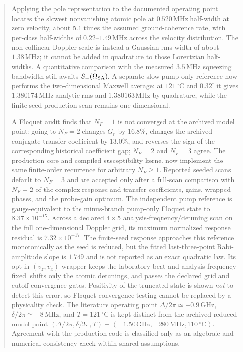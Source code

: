 \documentclass[11pt,a4paper]{article}
\newcommand{\GHz}{\,\mathrm{GHz}}
\newcommand{\MHz}{\,\mathrm{MHz}}
\newcommand{\degC}{\,^{\circ}\mathrm C}
\begin{document}
\begin{abstract}
Applying the pole representation to the documented operating point locates the
slowest nonvanishing atomic pole at $0.520\MHz$ half-width at zero velocity,
about $5.1$ times the assumed ground-coherence rate, with per-class half-widths
of $0.22$--$1.49\MHz$ across the velocity distribution. The non-collinear
Doppler scale is instead a Gaussian rms width of about $1.38\MHz$; it cannot be
added in quadrature to those Lorentzian half-widths. A quantitative comparison
with the measured $3.5\MHz$ squeezing bandwidth still awaits
$S_-(\Omega_{\rm SA})$. A separate slow pump-only reference now performs the
two-dimensional Maxwell average: at $121\degC$ and $0.32^\circ$ it gives
$1.380174\MHz$ analytic rms and $1.380163\MHz$ by quadrature, while the
finite-seed production scan remains one-dimensional.

A Floquet audit finds that $N_F=1$ is not converged at the archived model
point: going to $N_F=2$ changes $G_p$ by $16.8\%$, changes the archived
conjugate transfer coefficient by $13.0\%$, and reverses the sign of the
corresponding historical coefficient gap; $N_F=2$ and $N_F=3$ agree.
The production core and compiled susceptibility kernel now implement the same
finite-order recurrence for arbitrary $N_F\geq1$. Reported seeded scans default
to $N_F=3$ and are accepted only after a full-scan comparison with $N_F=2$ of
the complex response and transfer coefficients, gains, wrapped phases, and the
probe-gain optimum.
The independent pump reference is gauge-equivalent to the minus-branch
pump-only Floquet state to $8.37\times10^{-15}$. Across a declared
$4\times5$ analysis-frequency/detuning scan on the full one-dimensional
Doppler grid, its maximum normalized response residual is
$7.32\times10^{-17}$. The finite-seed response approaches this reference
monotonically as the seed is reduced, but the fitted last-three-point
Rabi-amplitude slope is $1.749$ and is not reported as an exact quadratic law.
Its opt-in $(v_z,v_x)$ wrapper keeps the laboratory beat and analysis
frequency fixed, shifts only the atomic detunings, and passes the declared
grid and cutoff convergence gates.
Positivity of
the truncated state is shown \emph{not} to detect this error, so Floquet
convergence testing cannot be replaced by a physicality check. The literature
operating point $\Delta/2\pi\simeq+0.9\GHz$, $\delta/2\pi\simeq-8\MHz$, and
$T=121\degC$ is kept distinct from the archived reduced-model point
$(\Delta/2\pi,\delta/2\pi,T)=(-1.50\GHz,-280\MHz,110\degC)$. Agreement with
the production code is classified only as an algebraic and numerical
consistency check within shared assumptions.
\end{abstract}
\end{document}
